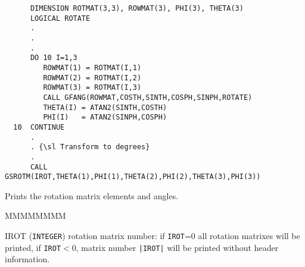 \begin{verbatim}
      DIMENSION ROTMAT(3,3), ROWMAT(3), PHI(3), THETA(3)
      LOGICAL ROTATE
      .
      .
      .
      DO 10 I=1,3
         ROWMAT(1) = ROTMAT(I,1)
         ROWMAT(2) = ROTMAT(I,2)
         ROWMAT(3) = ROTMAT(I,3)
         CALL GFANG(ROWMAT,COSTH,SINTH,COSPH,SINPH,ROTATE)
         THETA(I) = ATAN2(SINTH,COSTH)
         PHI(I)   = ATAN2(SINPH,COSPH)
  10  CONTINUE
      .
      . {\sl Transform to degrees}
      .
      CALL GSROTM(IROT,THETA(1),PHI(1),THETA(2),PHI(2),THETA(3),PHI(3))
\end{verbatim}
 
Prints the rotation matrix elements and angles.
\begin{DLtt}{MMMMMMMM}
\item[IROT]  ({\tt INTEGER}) rotation matrix number: if {\tt IROT}=0 all
rotation matrixes will be printed, if {\tt IROT}$<$0, matrix number
{\tt |IROT|} will be printed without header information.
\end{DLtt}
 
